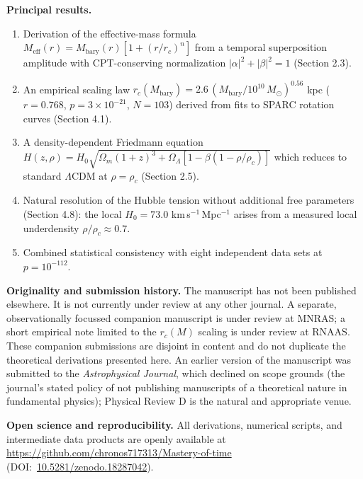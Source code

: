 \documentclass[12pt]{article}
\begin{document}
\bigskip

\textbf{Principal results.}
\begin{enumerate}
  \item Derivation of the effective-mass formula
    $M_\mathrm{eff}(r) = M_\mathrm{bary}(r)[1 + (r/r_c)^n]$ from a
    temporal superposition amplitude with CPT-conserving normalization
    $|\alpha|^2 + |\beta|^2 = 1$ (Section 2.3).
  \item An empirical scaling law
    $r_c(M_\mathrm{bary}) = 2.6\,(M_\mathrm{bary}/10^{10}\,M_\odot)^{0.56}$ kpc
    ($r = 0.768$, $p = 3\times10^{-21}$, $N = 103$) derived from fits
    to SPARC rotation curves (Section 4.1).
  \item A density-dependent Friedmann equation
    $H(z,\rho) = H_0\sqrt{\Omega_m(1+z)^3 + \Omega_\Lambda[1-\beta(1-\rho/\rho_c)]}$
    which reduces to standard $\Lambda$CDM at $\rho = \rho_c$ (Section
    2.5).
  \item Natural resolution of the Hubble tension without additional
    free parameters (Section 4.8): the local $H_0 = 73.0$
    km\,s$^{-1}$\,Mpc$^{-1}$ arises from a measured local underdensity
    $\rho/\rho_c \approx 0.7$.
  \item Combined statistical consistency with eight independent
    data sets at $p = 10^{-112}$.
\end{enumerate}

\bigskip

\textbf{Originality and submission history.}
The manuscript has not been published elsewhere. It is not currently
under review at any other journal. A separate, observationally
focussed companion manuscript is under review at MNRAS; a short
empirical note limited to the $r_c(M)$ scaling is under review at
RNAAS. These companion submissions are disjoint in content and do not
duplicate the theoretical derivations presented here. An earlier
version of the manuscript was submitted to the \textit{Astrophysical
Journal}, which declined on scope grounds (the journal's stated policy
of not publishing manuscripts of a theoretical nature in fundamental
physics); Physical Review D is the natural and appropriate venue.

\bigskip

\textbf{Open science and reproducibility.}
All derivations, numerical scripts, and intermediate data products
are openly available at
\url{https://github.com/chronos717313/Mastery-of-time}
(DOI:~\href{https://doi.org/10.5281/zenodo.18287042}{10.5281/zenodo.18287042}).
\end{document}
